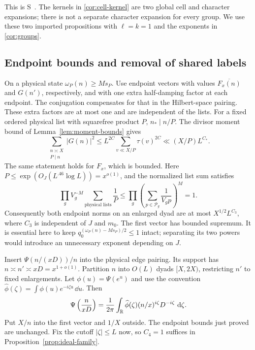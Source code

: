 This is S~\cite[Theorem~4.1 and Lemma~4.3]{SmoothShifted}.
The kernels
in \eqref{cor:cell-kernel} are two global cell and character expansions;
there is not a separate character expansion for every group.  We use
these two imported propositions with $\ell=k=1$ and the exponents in
\eqref{cor:groups}.

\subsection{Endpoint bounds and removal of shared labels}

On a physical state $\omega_P(n)\geq Ms_P$.  Use endpoint vectors
with values $\overline{F_x(n)}$ and $G(n')$, respectively, and with
one extra half-damping factor at each endpoint.  The conjugation
compensates for that in the Hilbert-space pairing.  These extra factors
are at most one and are independent of the lists.  For a fixed ordered
physical list with squarefree product $P$, $n_*\mid n/P$.  The divisor
moment bound of Lemma~\ref{lem:moment-bounds} gives
\[
 \sum_{\substack{n\asymp X\\P\mid n}}|G(n)|^2
 \leq L^{2C}\sum_{v\ll X/P}\tau(v)^{2C}
 \ll (X/P)L^{C_*}.
\]
The same statement holds for $F_x$, which is bounded.  Here
$P\leq\exp(O_J(L^{.46}\log L))=x^{o(1)}$, and the normalized list
sum satisfies
\begin{equation}\label{cor:list-norm}
 \prod_gV_g^{-M}\sum_{\text{physical lists}}\frac1P
 \leq\prod_g\left(\sum_{p\in\mathcal P_g}\frac1{V_gp}\right)^M=1.
\end{equation}
Consequently both endpoint norms on an enlarged dyad are at most
$X^{1/2}L^{C_3}$, where $C_3$ is independent of $J$ and $m_0$.
The first vector has bounded supremum.  It is essential here to keep
$q_0^{(\omega_P(n)-Ms_P)/2}\leq1$ intact; separating its two powers
would introduce an unnecessary exponent depending on $J$.

Insert $\Psi(n/(xD))/n$ into the physical edge pairing.  Its support
has $n\asymp n'\asymp xD=x^{1+o(1)}$.  Partition $n$ into $O(L)$
dyads $[X,2X)$, restricting $n'$ to fixed enlargements.  Let
$\phi(u)=\Psi(e^u)$ and use the convention
$\widehat\phi(\zeta)=\int\phi(u)e^{-i\zeta u}\,\dd u$.  Then
\begin{equation}\label{cor:insertion-separation}
 \Psi\left(\frac n{xD}\right)
   =\frac1{2\pi}\int_{\mathbb R}\widehat\phi(\zeta)
       (n/x)^{i\zeta}D^{-i\zeta}\,\,\mathrm d\zeta.
\end{equation}
Put $X/n$ into the first vector and $1/X$ outside.  The endpoint
bounds just proved are unchanged.  Fix the cutoff $|\zeta|\leq L$
now, so $C_4=1$ suffices in Proposition~\ref{prop:ideal-family}.

